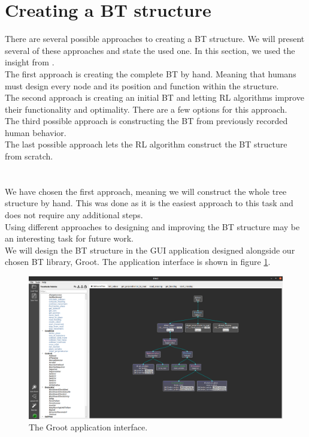 \section{Creating a BT structure}
    There are several possible approaches to creating a BT structure. We will present several of these approaches and state the used one. In this section, we used the insight from \cite{BT_creation}.\\
    The first approach is creating the complete BT by hand. Meaning that humans must design every node and its position and function within the structure.\\
    The second approach is creating an initial BT and letting RL algorithms improve their functionality and optimality. There are a few options for this approach.\\
    The third possible approach is constructing the BT from previously recorded human behavior.\\
    The last possible approach lets the RL algorithm construct the BT structure from scratch.\\\\
    \\
    We have chosen the first approach, meaning we will construct the whole tree structure by hand. This was done as it is the easiest approach to this task and does not require any additional steps.\\
    Using different approaches to designing and improving the BT structure may be an interesting task for future work.\\
    We will design the BT structure in the GUI application designed alongside our chosen BT library, Groot. The application interface is shown in figure \ref{fig:groot}.
    \begin{figure}[ht]
        \centering
        \includegraphics[width=\linewidth]{images/Groot.png}
        \caption{The Groot application interface.}
        \label{fig:groot}
    \end{figure}

